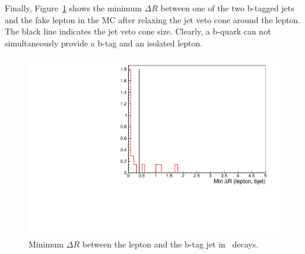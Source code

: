 Finally, Figure~\ref{fig:ttbar_residual} shows the minimum $\Delta R$ between one of the two b-tagged jets and 
the fake lepton in the MC after 
relaxing the jet veto cone around the lepton. 
The black line indicates the jet veto cone size. Clearly, a b-quark can not simultaneously provide a b-tag and an isolated lepton.

\begin{figure}[htb]
\begin{center}
\includegraphics[width=0.6\linewidth, height=0.4\linewidth]{figs/bjetlepton.pdf}
\caption{ Minimum $\Delta R$ between the lepton and the b-tag jet in \ttbar\ decays.\label{fig:ttbar_residual}}
\end{center}
\end{figure}




 




